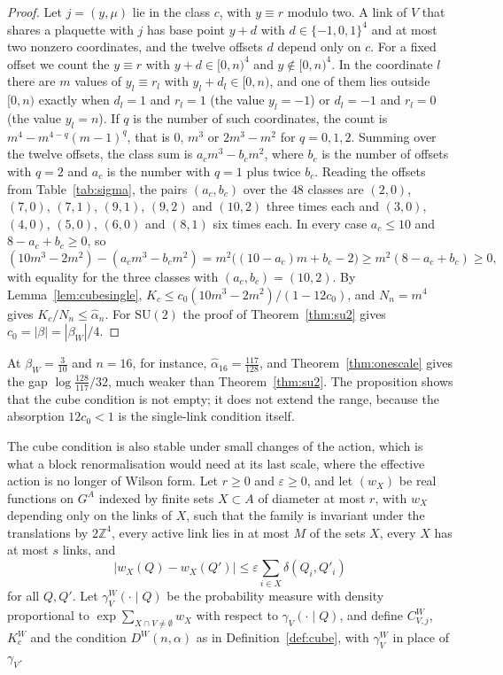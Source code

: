 \documentclass[11pt]{amsart}
\theoremstyle{definition}
\theoremstyle{remark}
\numberwithin{equation}{section}
\newcommand{\Z}{\mathbb{Z}}
\newcommand{\SU}{\mathrm{SU}}
\begin{document}
\begin{proof}
Let $j=(y,\mu)$ lie in the class $c$, with $y\equiv r$ modulo two. A link of
$V$ that shares a plaquette with $j$ has base point $y+d$ with
$d\in\{-1,0,1\}^4$ and at most two nonzero coordinates, and the twelve
offsets $d$ depend only on $c$. For a fixed offset we count the $y\equiv r$
with $y+d\in[0,n)^4$ and $y\notin[0,n)^4$. In the coordinate $l$ there are
$m$ values of $y_l\equiv r_l$ with $y_l+d_l\in[0,n)$, and one of them lies
outside $[0,n)$ exactly when $d_l=1$ and $r_l=1$ (the value $y_l=-1$) or
$d_l=-1$ and $r_l=0$ (the value $y_l=n$). If $q$ is the number of such
coordinates, the count is $m^4-m^{4-q}(m-1)^q$, that is $0$, $m^3$ or
$2m^3-m^2$ for $q=0,1,2$. Summing over the twelve offsets, the class sum is
$a_cm^3-b_cm^2$, where $b_c$ is the number of offsets with $q=2$ and $a_c$ is
the number with $q=1$ plus twice $b_c$. Reading the offsets from
Table~\ref{tab:sigma}, the pairs $(a_c,b_c)$ over the $48$ classes are
$(2,0)$, $(7,0)$, $(7,1)$, $(9,1)$, $(9,2)$ and $(10,2)$ three times each and
$(3,0)$, $(4,0)$, $(5,0)$, $(6,0)$ and $(8,1)$ six times each. In every case
$a_c\le10$ and $8-a_c+b_c\ge0$, so
\[
(10m^3-2m^2)-(a_cm^3-b_cm^2)=m^2\bigl((10-a_c)m+b_c-2\bigr)
\ge m^2(8-a_c+b_c)\ge0,
\]
with equality for the three classes with $(a_c,b_c)=(10,2)$. By
Lemma~\ref{lem:cubesingle}, $K_c\le c_0(10m^3-2m^2)/(1-12c_0)$, and $N_n=m^4$
gives $K_c/N_n\le\hat\alpha_n$. For $\SU(2)$ the proof of
Theorem~\ref{thm:su2} gives $c_0=|\beta|=|\beta_W|/4$.
\end{proof}

At $\beta_W=\frac3{10}$ and $n=16$, for instance, $\hat\alpha_{16}=
\frac{117}{128}$, and Theorem~\ref{thm:onescale} gives the gap
$\log\frac{128}{117}/32$, much weaker than Theorem~\ref{thm:su2}. The
proposition shows that the cube condition is not empty; it does not extend
the range, because the absorption $12c_0<1$ is the single-link condition
itself.

The cube condition is also stable under small changes of the action, which
is what a block renormalisation would need at its last scale, where the
effective action is no longer of Wilson form. Let $r\ge0$ and
$\varepsilon\ge0$, and let $(w_X)$ be real functions on $G^A$ indexed by
finite sets $X\subset A$ of diameter at most $r$, with $w_X$ depending only
on the links of $X$, such that the family is invariant under the
translations by $2\Z^4$, every active link lies in at most $M$ of the sets
$X$, every $X$ has at most $s$ links, and
\[
|w_X(Q)-w_X(Q')|\le\varepsilon\sum_{i\in X}\delta(Q_i,Q'_i)
\]
for all $Q,Q'$. Let $\gamma^W_V(\cdot\mid Q)$ be the probability measure
with density proportional to $\exp\sum_{X\cap V\ne\emptyset}w_X$ with respect
to $\gamma_V(\cdot\mid Q)$, and define $C^W_{V,j}$, $K^W_c$ and the condition
$D^W(n,\alpha)$ as in Definition~\ref{def:cube}, with $\gamma^W_V$ in place
of $\gamma_V$.
\end{document}
